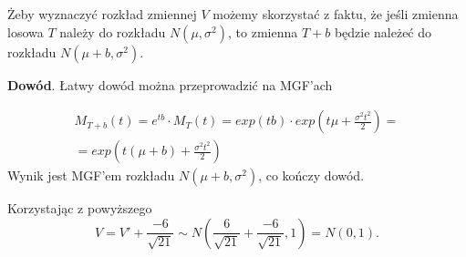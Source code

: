 \documentclass[12pt,a4paper]{article}
\begin{document}
Żeby wyznaczyć rozkład zmiennej $V$ możemy skorzystać z faktu, że jeśli zmienna losowa $T$ należy do rozkładu \( N(\mu, \sigma^2) \), to zmienna \(T + b\) będzie należeć do rozkładu \( N(\mu + b , \sigma^2) \).

\noindent
\textbf{Dowód}. Łatwy dowód można przeprowadzić na MGF'ach

\begin{gather*}
	M_{T + b}(t) = e^{tb} \cdot M_T(t) = exp(tb) \cdot exp\left( t\mu + \frac{\sigma^2 t^2}{2} \right) =\\=
	exp\left( t(\mu + b) + \frac{\sigma^2 t^2}{2} \right)
\end{gather*}
Wynik jest MGF'em rozkładu \( N( \mu + b, \sigma^2) \), co kończy dowód. 

Korzystając z powyższego
\[
	V = V' + \frac{-6}{\sqrt{21}}  \sim N \left( \frac{6}{\sqrt{21}} + \frac{-6}{\sqrt{21}}, 1 \right) = N(0,1).
\]
\end{document}
